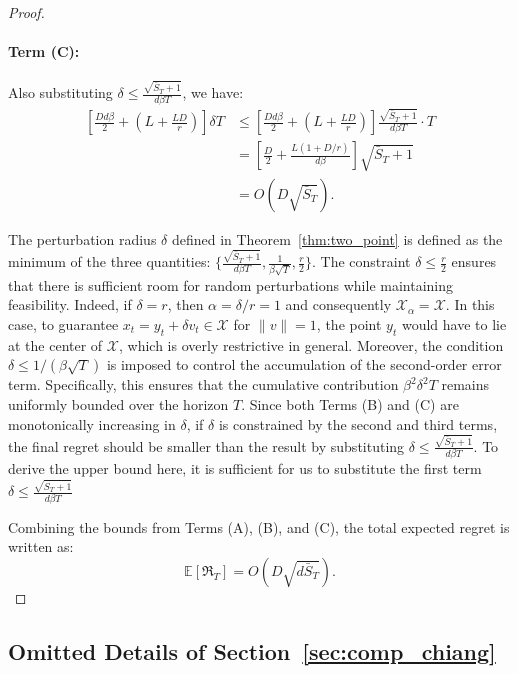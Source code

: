 \documentclass[journal,onecolumn]{IEEEtran}
\newcommand{\cX}{\mathcal{X}}
\theoremstyle{plain}
\theoremstyle{definition}
\theoremstyle{remark}
\newcommand{\regret}{\mathfrak{R}}
\begin{document}
{\begin{proof}
    \paragraph{Term (C):}
    Also substituting $\delta \le \frac{\sqrt{\bar{S}_{T}+1}}{d\beta T}$, we have:
    \begin{align*}
        \left[ \frac{Dd\beta}{2}+ \left(L+\frac{LD}{r}\right) \right] \delta T & \le \left[ \frac{Dd\beta}{2}+ \left(L+\frac{LD}{r}\right) \right] \frac{\sqrt{\bar{S}_{T}+1}}{d\beta T}\cdot T \\
        & = \left[ \frac{D}{2}+ \frac{L(1+D/r)}{d\beta}\right] \sqrt{\bar{S}_{T}+1}\\
        & = O\left( D \sqrt{\bar{S}_{T}}\right).
    \end{align*}

    The perturbation radius $\delta$ defined in Theorem~\ref{thm:two_point} is defined as the minimum of the three quantities: $\{ \frac{\sqrt{\bar{S}_{T}+1}}{d\beta T}, \frac{1}{\beta\sqrt{T}}, \frac{r}{2}\}$. The constraint $\delta\leq \frac{r}{2}$ ensures that there is sufficient room for random perturbations while maintaining feasibility. Indeed, if $\delta= r$, then $\alpha=\delta/r=1$ and consequently $\cX_\alpha=\cX$. In this case, to guarantee $x_t=y_t+\delta v_t\in \cX$ for $\|v\|=1$, the point $y_t$ would have to lie at the center of $\cX$, which is overly restrictive in general. Moreover, the condition $\delta\leq 1/(\beta\sqrt{T})$ is imposed to control the accumulation of the second-order error term. Specifically, this ensures that the cumulative contribution $\beta^2\delta^2 T$ remains uniformly bounded over the horizon $T$. Since both Terms (B) and (C) are monotonically increasing in $\delta$, if $\delta$ is constrained by the second and third terms, the final regret should be smaller than the result by substituting $\delta\leq \frac{\sqrt{\bar{S}_{T}+1}}{d\beta T}$.  To derive the upper bound here, it is sufficient for us to substitute the first term $\delta\leq \frac{\sqrt{\bar{S}_{T}+1}}{d\beta T}$

    Combining the bounds from Terms (A), (B), and (C), the total expected regret is
    written as:
    \begin{equation*}
        \mathbb{E}[\regret_{T}] = O\left( D \sqrt{d \bar S_{T}}\right).
    \end{equation*}
\end{proof}

\subsection{Omitted Details of Section~\ref{sec:comp_chiang}}\label{app:comp_chiang}

}
\end{document}

